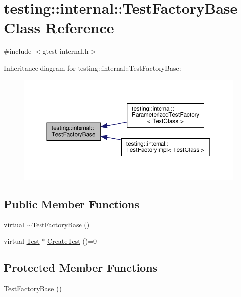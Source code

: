 \hypertarget{classtesting_1_1internal_1_1TestFactoryBase}{}\section{testing\+:\+:internal\+:\+:Test\+Factory\+Base Class Reference}
\label{classtesting_1_1internal_1_1TestFactoryBase}


{\ttfamily \#include $<$gtest-\/internal.\+h$>$}



Inheritance diagram for testing\+:\+:internal\+:\+:Test\+Factory\+Base\+:\nopagebreak
\begin{figure}[H]
\begin{center}
\leavevmode
\includegraphics[width=350pt]{classtesting_1_1internal_1_1TestFactoryBase__inherit__graph}
\end{center}
\end{figure}
\subsection*{Public Member Functions}
\begin{DoxyCompactItemize}
\item 
virtual \hyperlink{classtesting_1_1internal_1_1TestFactoryBase_a18f22a7594336a36642289c1decddc9e}{$\sim$\+Test\+Factory\+Base} ()
\item 
virtual \hyperlink{classtesting_1_1Test}{Test} $\ast$ \hyperlink{classtesting_1_1internal_1_1TestFactoryBase_a07ac3ca0b196cdb092da0bb186b7c030}{Create\+Test} ()=0
\end{DoxyCompactItemize}
\subsection*{Protected Member Functions}
\begin{DoxyCompactItemize}
\item 
\hyperlink{classtesting_1_1internal_1_1TestFactoryBase_afedbf147b2a213517b315880d8c81427}{Test\+Factory\+Base} ()
\end{DoxyCompactItemize}
